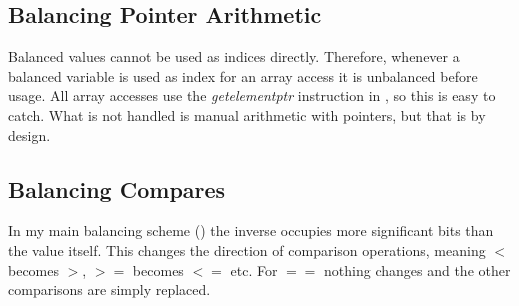 \subsection{Balancing Pointer Arithmetic}
Balanced values cannot be used as indices directly.
Therefore, whenever a balanced variable is used as index for an array access it is unbalanced before usage.
All array accesses use the \emph{getelementptr} instruction in \ir{}, so this is easy to catch.
What is not handled is manual arithmetic with pointers, but that is by design.

\subsection{Balancing Compares}
In my main balancing scheme () the inverse occupies more significant bits than the value itself.
This changes the direction of comparison operations, meaning $<$ becomes $>$, $>=$ becomes $<=$ etc.
For $==$ nothing changes and the other comparisons are simply replaced.
